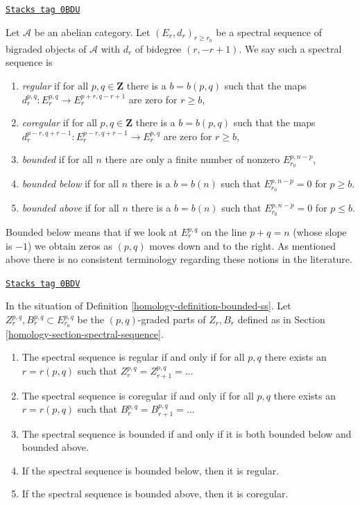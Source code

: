 \begin{definition}[Bounded ss]
\label{homology-definition-bounded-ss}
\href{https://stacks.math.columbia.edu/tag/0BDU}{\texttt{Stacks tag 0BDU}}

Let $\mathcal{A}$ be an abelian category. Let $(E_r, d_r)_{r \geq r_0}$
be a spectral sequence of bigraded objects of
$\mathcal{A}$ with $d_r$ of bidegree $(r, -r + 1)$.
We say such a spectral sequence is
\begin{enumerate}
\item {\it regular} if for all $p, q \in \mathbf{Z}$ there is
a $b = b(p, q)$ such that the maps
$d_r^{p, q} : E_r^{p, q} \to E_r^{p + r, q - r + 1}$ are zero for $r \geq b$,
\item {\it coregular} if for all $p, q \in \mathbf{Z}$ there is a
$b = b(p, q)$ such that the maps
$d_r^{p - r, q + r - 1} : E_r^{p - r, q + r - 1} \to E_r^{p, q}$
are zero for $r \geq b$,
\item {\it bounded} if for all $n$
there are only a finite number of nonzero $E_{r_0}^{p, n - p}$,
\item {\it bounded below} if for all $n$ there is a $b = b(n)$ such that
$E_{r_0}^{p, n - p} = 0$ for $p \geq b$.
\item {\it bounded above} if for all $n$ there is a $b = b(n)$ such that
$E_{r_0}^{p, n - p} = 0$ for $p \leq b$.
\end{enumerate}
\end{definition}

Bounded below means that if we look at $E_r^{p, q}$ on the line
$p + q = n$ (whose slope is $-1$) we obtain zeros as $(p, q)$
moves down and to the right.
As mentioned above there is no consistent terminology regarding
these notions in the literature.

\begin{lemma}
\label{homology-lemma-relate-boundedness}
\href{https://stacks.math.columbia.edu/tag/0BDV}{\texttt{Stacks tag 0BDV}}

In the situation of Definition \ref{homology-definition-bounded-ss}.
Let $Z_r^{p, q}, B_r^{p, q} \subset E_{r_0}^{p, q}$ be the
$(p, q)$-graded parts of $Z_r, B_r$ defined as in
Section \ref{homology-section-spectral-sequence}.
\begin{enumerate}
\item The spectral sequence is regular if and only if for all $p, q$
there exists an $r = r(p, q)$ such that
$Z_r^{p, q} = Z_{r + 1}^{p, q} = \ldots$
\item The spectral sequence is coregular if and only if for all $p, q$
there exists an $r = r(p, q)$ such that
$B_r^{p, q} = B_{r + 1}^{p, q} = \ldots$
\item The spectral sequence is bounded if and only if it is both
bounded below and bounded above.
\item If the spectral sequence is bounded below, then it is regular.
\item If the spectral sequence is bounded above, then it is coregular.
\end{enumerate}
\end{lemma}

